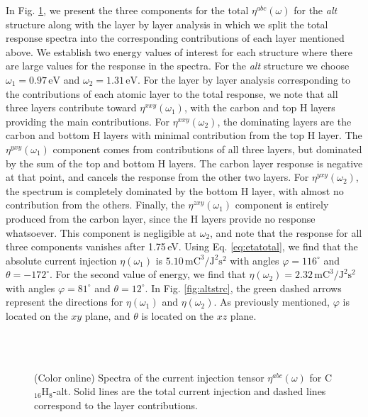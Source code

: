 \documentclass[pss]{wiley2sp} %
\begin{document}
In Fig. \ref{fig:alt-eta}, we present the three components for the total
$\eta^{abc}(\omega)$ for the 
\emph{alt} structure along with the layer by layer analysis in which we split
the total response spectra into the corresponding contributions of each layer
mentioned above. We establish two energy values of interest for each structure
where there are large values for the response in the spectra. For the
\emph{alt} structure we choose $\omega_{1} = 0.97\,\mathrm{eV}$ and $\omega_{2} =
1.31\,\mathrm{eV}$. For the layer by layer analysis corresponding to the
contributions of each atomic layer to the total response, we note that all
three layers contribute toward $\eta^{xxy}(\omega_{1})$, with the carbon
and top H layers providing the main contributions. For $\eta^{xxy}(\omega_{2})$, the
dominating layers are the carbon and bottom H layers with minimal contribution
from the top H layer. The $\eta^{yxy}(\omega_{1})$ component comes from 
contributions of all three layers, but dominated by the sum of the
top and bottom H layers. The carbon layer response is negative at that point,
and cancels the response from the other two layers. For
$\eta^{yxy}(\omega_{2})$, the spectrum is completely dominated by the bottom H layer, with
almost no contribution from the others. Finally, the
$\eta^{zxy}(\omega_{1})$ component is entirely produced from the carbon layer,
since the H layers provide no response whatsoever. This component is negligible
at $\omega_{2}$, and note that the response for all three components vanishes after
1.75\,eV. Using Eq. \eqref{eq:etatotal}, we find that the absolute current
injection $\eta(\omega_{1})$ is
$5.10\,\mathrm{mC}^{3}/\mathrm{J}^{2}\mathrm{s}^{2}$ with angles
$\varphi=116^{\circ}$ and $\theta=-172^{\circ}$. For the second value of energy, we find that
$\eta(\omega_{2})=2.32\,\mathrm{mC}^{3}/\mathrm{J}^{2}\mathrm{s}^{2}$ with angles
$\varphi=81^{\circ}$ and $\theta=12^{\circ}$. In Fig.
\ref{fig:altstrc}, the green dashed arrows represent the directions for
$\eta(\omega_{1})$ and $\eta(\omega_{2})$. As previously mentioned, 
$\varphi$ is located on the $xy$ plane, and $\theta$ is located on
the $xz$ plane.

\begin{figure}[t]
\centering
{}\\
\\
\caption{(Color online) Spectra of the current injection tensor
{$\eta^{abc}(\omega)$} for C$_{16}$H$_{8}$-alt. Solid lines are the total
current injection and dashed lines correspond to the layer
contributions.\label{fig:alt-eta}}
\end{figure}
\end{document}
